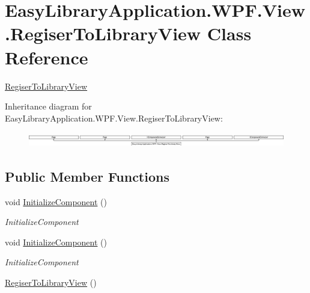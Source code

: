 \hypertarget{class_easy_library_application_1_1_w_p_f_1_1_view_1_1_regiser_to_library_view}{}\section{Easy\+Library\+Application.\+W\+P\+F.\+View.\+Regiser\+To\+Library\+View Class Reference}
\label{class_easy_library_application_1_1_w_p_f_1_1_view_1_1_regiser_to_library_view}


\mbox{\hyperlink{class_easy_library_application_1_1_w_p_f_1_1_view_1_1_regiser_to_library_view}{Regiser\+To\+Library\+View}}  


Inheritance diagram for Easy\+Library\+Application.\+W\+P\+F.\+View.\+Regiser\+To\+Library\+View\+:\begin{figure}[H]
\begin{center}
\leavevmode
\includegraphics[height=0.649275cm]{class_easy_library_application_1_1_w_p_f_1_1_view_1_1_regiser_to_library_view}
\end{center}
\end{figure}
\subsection*{Public Member Functions}
\begin{DoxyCompactItemize}
\item 
void \mbox{\hyperlink{class_easy_library_application_1_1_w_p_f_1_1_view_1_1_regiser_to_library_view_a4b64a06d6b400c4651aa08bbc0aa87a5}{Initialize\+Component}} ()
\begin{DoxyCompactList}\small\item\em Initialize\+Component \end{DoxyCompactList}\item 
void \mbox{\hyperlink{class_easy_library_application_1_1_w_p_f_1_1_view_1_1_regiser_to_library_view_a4b64a06d6b400c4651aa08bbc0aa87a5}{Initialize\+Component}} ()
\begin{DoxyCompactList}\small\item\em Initialize\+Component \end{DoxyCompactList}\item 
\mbox{\hyperlink{class_easy_library_application_1_1_w_p_f_1_1_view_1_1_regiser_to_library_view_a41de20f79c20d26bcc7bbf4208a7f60b}{Regiser\+To\+Library\+View}} ()
\end{DoxyCompactItemize}


